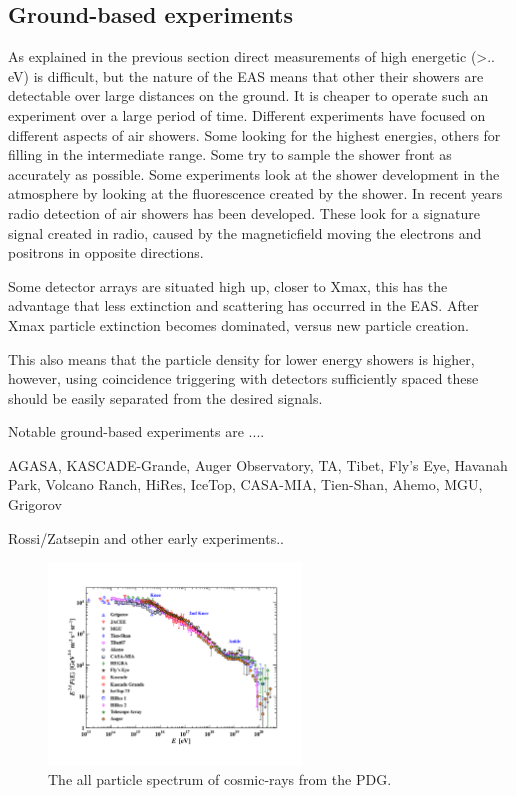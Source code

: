 \subsection{Ground-based experiments}

As explained in the previous section direct measurements of high energetic (>.. eV) is difficult, but the nature of the EAS means that other their showers are detectable over large distances on the ground. It is cheaper to operate such an experiment over a large period of time. Different experiments have focused on different aspects of air showers. Some looking for the highest energies, others for filling in the intermediate range. Some try to sample the shower front as accurately as possible. Some experiments look at the shower development in the atmosphere by looking at the fluorescence created by the shower. In recent years radio detection of air showers has been developed. These look for a signature signal created in radio, caused by the magneticfield moving the electrons and positrons in opposite directions.

Some detector arrays are situated high up, closer to Xmax, this has the advantage that less extinction and scattering has occurred in the EAS. After Xmax particle extinction becomes dominated, versus new particle creation. 

This also means that the particle density for lower energy showers is higher, however, using coincidence triggering with detectors sufficiently spaced these should be easily separated from the desired signals.

Notable ground-based experiments are ....

AGASA, KASCADE-Grande, Auger Observatory, TA, Tibet, Fly's Eye, Havanah Park, Volcano Ranch, HiRes, IceTop, CASA-MIA, Tien-Shan, Ahemo, MGU, Grigorov

Rossi/Zatsepin and other early experiments..


\begin{figure}
    \centering
    \includegraphics[width=0.6\textwidth]
                    {plots/cosmic-rays/PDG_28_8_all_particle_spectrum}
    \caption{The all particle spectrum of cosmic-rays from the PDG.}
    \label{fig:spectrum}
\end{figure}



